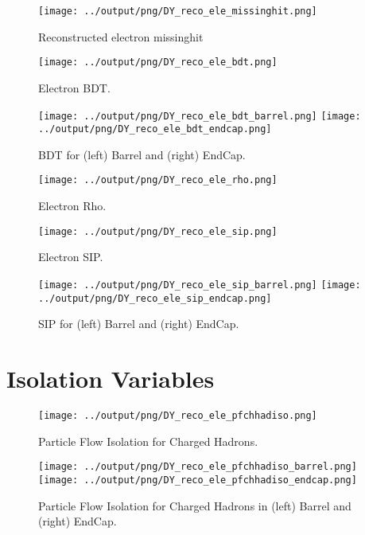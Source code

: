 \documentclass[11pt]{book}
\begin{document}
\begin{figure}[ht]
\centering
\texttt{[image: ../output/png/DY\_reco\_ele\_missinghit.png]}
\caption{Reconstructed electron missinghit}
\label{fig:dy_reco_ele_missinghit}
\end{figure}

\begin{figure}[ht]
\centering
\texttt{[image: ../output/png/DY\_reco\_ele\_bdt.png]}
\caption{Electron BDT.}
\label{fig:dy_reco_ele_bdt}
\end{figure}

\begin{figure}[ht]
\centering
\texttt{[image: ../output/png/DY\_reco\_ele\_bdt\_barrel.png]}
\texttt{[image: ../output/png/DY\_reco\_ele\_bdt\_endcap.png]}
\caption{BDT for (left) Barrel and (right) EndCap.}
\label{fig:dy_reco_ele_bdt_regions}
\end{figure}

\begin{figure}[ht]
\centering
\texttt{[image: ../output/png/DY\_reco\_ele\_rho.png]}
\caption{Electron Rho.}
\label{fig:dy_reco_ele_rho}
\end{figure}

\begin{figure}[ht]
\centering
\texttt{[image: ../output/png/DY\_reco\_ele\_sip.png]}
\caption{Electron SIP.}
\label{fig:dy_reco_ele_sip}
\end{figure}

\begin{figure}[ht]
\centering
\texttt{[image: ../output/png/DY\_reco\_ele\_sip\_barrel.png]}
\texttt{[image: ../output/png/DY\_reco\_ele\_sip\_endcap.png]}
\caption{SIP for (left) Barrel and (right) EndCap.}
\label{fig:dy_reco_ele_sip_regions}
\end{figure}
\clearpage

\section{Isolation Variables}

\begin{figure}[ht]
\centering
\texttt{[image: ../output/png/DY\_reco\_ele\_pfchhadiso.png]}
\caption{Particle Flow Isolation for Charged Hadrons.}
\label{fig:dy_reco_ele_pfchhadiso}
\end{figure}

\begin{figure}[ht]
\centering
\texttt{[image: ../output/png/DY\_reco\_ele\_pfchhadiso\_barrel.png]}
\texttt{[image: ../output/png/DY\_reco\_ele\_pfchhadiso\_endcap.png]}
\caption{Particle Flow Isolation for Charged Hadrons in (left) Barrel and (right) EndCap.}
\label{fig:dy_reco_ele_pfchhadiso_regions}
\end{figure}
\end{document}
